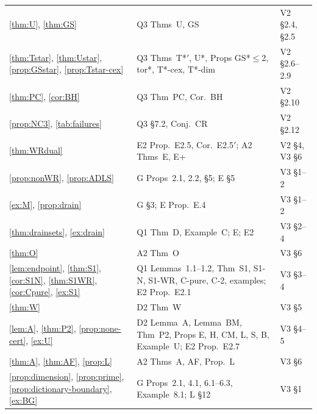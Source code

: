 \documentclass[11pt,a4paper]{report}
\begin{document}
{\begin{longtable}{>{\raggedright\arraybackslash}p{2.4cm}>{\raggedright\arraybackslash}p{6.0cm}>{\raggedright\arraybackslash}p{4.6cm}}
\ref{thm:U}, \ref{thm:GS} & Q3 Thms~U, GS & V2 §2.4, §2.5 \\
\ref{thm:Tstar}, \ref{thm:Ustar}, \ref{prop:GSstar}, \ref{prop:Tstar-cex} & Q3 Thms~T*\('\), U*, Props GS*\(\le\)2, tor*, T*-cex, T*-dim & V2 §2.6--2.9 \\
\ref{thm:PC}, \ref{cor:BH} & Q3 Thm~PC, Cor.~BH & V2 §2.10 \\
\ref{prop:NC3}, \ref{tab:failures} & Q3 §7.2, Conj.~CR & V2 §2.12 \\
\ref{thm:WRdual} & E2 Prop.~E2.5, Cor.~E2.5\('\); A2 Thms~E, E+ & V2 §4, V3 §6 \\
\ref{prop:nonWR}, \ref{prop:ADLS} & G Props~2.1, 2.2, §5; E §5 & V3 §1--2 \\
\ref{ex:M}, \ref{prop:drain} & G §3; E Prop.~E.4 & V3 §1--2 \\
\ref{thm:drainsets}, \ref{ex:drain} & Q1 Thm~D, Example~C; E; E2 & V3 §2--4 \\
\ref{thm:O} & A2 Thm~O & V3 §6 \\
\ref{lem:endpoint}, \ref{thm:S1}, \ref{cor:S1N}, \ref{thm:S1WR}, \ref{cor:Cpure}, \ref{ex:S1} & Q1 Lemmas~1.1--1.2, Thm~S1, S1-N, S1-WR, C-pure, C-2, examples; E2 Prop.~E2.1 & V3 §3--4 \\
\ref{thm:W} & D2 Thm~W & V3 §5 \\
\ref{lem:A}, \ref{thm:P2}, \ref{prop:none-cert}, \ref{ex:U} & D2 Lemma~A, Lemma~BM, Thm~P2, Props E, H, CM, L, S, B, Example~U; E2 Prop.~E2.7 & V3 §4--5 \\
\ref{thm:A}, \ref{thm:AF}, \ref{prop:L} & A2 Thms~A, AF, Prop.~L & V3 §6 \\
\ref{prop:dimension}, \ref{prop:prime}, \ref{prop:dictionary-boundary}, \ref{ex:BG} & G Props~2.1, 4.1, 6.1--6.3, Example~8.1; L §12 & V3 §1 \\
\hline
\end{longtable}
}

\paperreferences
\end{document}

